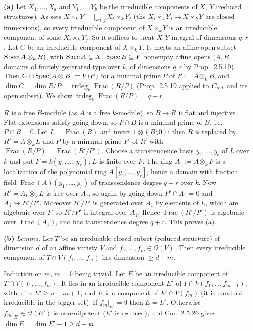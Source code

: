 \documentclass[11pt]{article}
\begin{document}
\textbf{(a)} Let $X_1,\dots,X_a$ and $Y_1,\dots,Y_b$ be the irreducible components of $X$, $Y$ (reduced structures). As sets $X\times_kY=\bigcup_{i,j}X_i\times_kY_j$ (the $X_i\times_kY_j\to X\times_kY$ are closed immersions), so every irreducible component of $X\times_kY$ is an irreducible component of some $X_i\times_kY_j$. So it suffices to treat $X,Y$ integral of dimensions $q,r$. Let $C$ be an irreducible component of $X\times_kY$. It meets an affine open subset $\operatorname{Spec}(A\otimes_kB)$, with $\operatorname{Spec} A\subseteq X$, $\operatorname{Spec} B\subseteq Y$ nonempty affine opens ($A,B$ domains of finitely generated type over $k$, of dimensions $q,r$ by Prop.~2.5.19). Then $C\cap\operatorname{Spec}(A\otimes B)=V(P)$ for a minimal prime $P$ of $R:=A\otimes_kB$, and $\dim C=\dim R/P=\operatorname{trdeg}_k\operatorname{Frac}(R/P)$ (Prop.~2.5.19 applied to $C_{\rm red}$ and its open subset). We show $\operatorname{trdeg}_k\operatorname{Frac}(R/P)=q+r$.

$R$ is a free $B$-module (as $A$ is a free $k$-module), so $B\to R$ is flat and injective. Flat extensions satisfy going-down, so $P\cap B$ is a minimal prime of $B$, i.e.\ $P\cap B=0$. Let $L=\operatorname{Frac}(B)$ and invert $1\otimes(B\setminus0)$: then $R$ is replaced by $R'=A\otimes_kL$ and $P$ by a minimal prime $P'$ of $R'$ with $\operatorname{Frac}(R/P)=\operatorname{Frac}(R'/P')$. Choose a transcendence basis $y_1,\dots,y_r$ of $L$ over $k$ and put $F=k(y_1,\dots,y_r)$; $L$ is finite over $F$. The ring $A_1:=A\otimes_kF$ is a localization of the polynomial ring $A[y_1,\dots,y_r]$, hence a domain with fraction field $\operatorname{Frac}(A)(y_1,\dots,y_r)$ of transcendence degree $q+r$ over $k$. Now $R'=A_1\otimes_FL$ is free over $A_1$, so again by going-down $P'\cap A_1=0$ and $A_1\hookrightarrow R'/P'$. Moreover $R'/P'$ is generated over $A_1$ by elements of $L$, which are algebraic over $F$, so $R'/P'$ is integral over $A_1$. Hence $\operatorname{Frac}(R'/P')$ is algebraic over $\operatorname{Frac}(A_1)$, and has transcendence degree $q+r$. This proves (a).

\textbf{(b)} \emph{Lemma.} Let $T$ be an irreducible closed subset (reduced structure) of dimension $d$ of an affine variety $V$ and $f_1,\dots,f_m\in\mathcal O(V)$. Then every irreducible component of $T\cap V(f_1,\dots,f_m)$ has dimension $\ge d-m$.

Induction on $m$, $m=0$ being trivial. Let $E$ be an irreducible component of $T\cap V(f_1,\dots,f_m)$. It lies in an irreducible component $E'$ of $T\cap V(f_1,\dots,f_{m-1})$, with $\dim E'\ge d-m+1$, and $E$ is a component of $E'\cap V(f_m)$ (it is maximal irreducible in the bigger set). If $f_m|_{E'}=0$ then $E=E'$. Otherwise $f_m|_{E'}\in\mathcal O(E')$ is non-nilpotent ($E'$ is reduced), and Cor.~2.5.26 gives $\dim E=\dim E'-1\ge d-m$.
\end{document}
